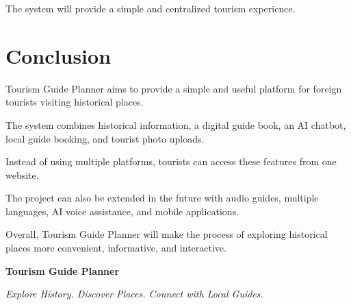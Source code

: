 \documentclass[12pt,a4paper]{article}
\begin{document}
The system will provide a simple and centralized tourism experience.



\section{Conclusion}

Tourism Guide Planner aims to provide a simple and useful platform for
foreign tourists visiting historical places.

The system combines historical information, a digital guide book, an AI
chatbot, local guide booking, and tourist photo uploads.

Instead of using multiple platforms, tourists can access these features
from one website.

The project can also be extended in the future with audio guides,
multiple languages, AI voice assistance, and mobile applications.

Overall, Tourism Guide Planner will make the process of exploring
historical places more convenient, informative, and interactive.

\vspace{1cm}

\begin{center}

\textbf{Tourism Guide Planner}

\vspace{0.3cm}

\textit{Explore History. Discover Places. Connect with Local Guides.}

\end{center}
\end{document}
